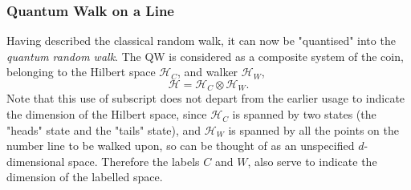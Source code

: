 \subsubsection{Quantum Walk on a Line}
\label{subsubsection:q_r_w}
Having described the classical random walk, it can now be "quantised" into the \emph{quantum random walk}.
The QW is considered as a composite system of the coin, belonging to the Hilbert space $\mathcal{H}_C$, and walker $\mathcal{H}_W$,
\begin{equation}
    \mathcal{H} = \mathcal{H}_C \otimes \mathcal{H}_W.
\end{equation}
Note that this use of subscript does not depart from the earlier usage to indicate the dimension of the Hilbert space, since $\mathcal{H}_C$ is spanned by two states (the "heads" state and the "tails" state), and $\mathcal{H}_W$ is spanned by all the points on the number line to be walked upon, so can be thought of as an unspecified $d$-dimensional space.
Therefore the labels $C$ and $W$, also serve to indicate the dimension of the labelled space.

